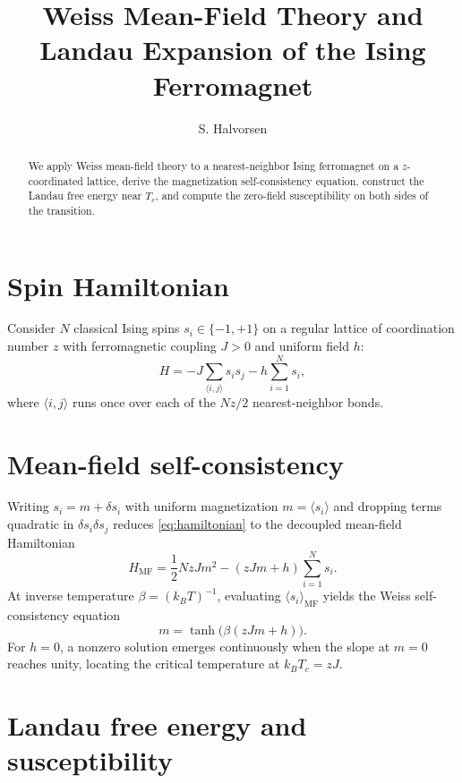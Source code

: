 \documentclass{article}
\title{Weiss Mean-Field Theory and Landau Expansion of the Ising Ferromagnet}
\author{S. Halvorsen}
\date{}
\begin{document}
\maketitle

\begin{abstract}
We apply Weiss mean-field theory to a nearest-neighbor Ising ferromagnet on a
$z$-coordinated lattice, derive the magnetization self-consistency equation,
construct the Landau free energy near $T_c$, and compute the zero-field
susceptibility on both sides of the transition.
\end{abstract}

\section{Spin Hamiltonian}\label{sec:model}

Consider $N$ classical Ising spins $s_i \in \{-1,+1\}$ on a regular lattice of
coordination number $z$ with ferromagnetic coupling $J > 0$ and uniform field $h$:
\begin{equation}\label{eq:hamiltonian}
  H = -J \sum_{\langle i,j \rangle} s_i s_j - h \sum_{i=1}^{N} s_i,
\end{equation}
where $\langle i,j \rangle$ runs once over each of the $N z / 2$ nearest-neighbor bonds.

\section{Mean-field self-consistency}\label{sec:self-consistency}

Writing $s_i = m + \delta s_i$ with uniform magnetization $m = \langle s_i \rangle$
and dropping terms quadratic in $\delta s_i \delta s_j$ reduces \eqref{eq:hamiltonian}
to the decoupled mean-field Hamiltonian
\[
  H_{\mathrm{MF}} = \frac{1}{2} N z J m^2 - (z J m + h)\sum_{i=1}^{N} s_i.
\]
At inverse temperature $\beta = (k_B T)^{-1}$, evaluating $\langle s_i \rangle_{\mathrm{MF}}$
yields the Weiss self-consistency equation
\begin{equation}\label{eq:mfeq}
  m = \tanh\bigl(\beta (z J m + h)\bigr).
\end{equation}
For $h = 0$, a nonzero solution emerges continuously when the slope at $m = 0$
reaches unity, locating the critical temperature at $k_B T_c = z J$.

\section{Landau free energy and susceptibility}\label{sec:landau}
\end{document}

